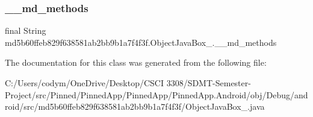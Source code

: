 \subsubsection{\texorpdfstring{\+\_\+\+\_\+md\+\_\+methods}{\_\_md\_methods}}
{\footnotesize\ttfamily final String md5b60ffeb829f638581ab2bb9b1a7f4f3f.\+Object\+Java\+Box\+\_.\+\_\+\+\_\+md\+\_\+methods\hspace{0.3cm}{\ttfamily [static]}}



The documentation for this class was generated from the following file\+:\begin{DoxyCompactItemize}
\item 
C\+:/\+Users/codym/\+One\+Drive/\+Desktop/\+C\+S\+C\+I 3308/\+S\+D\+M\+T-\/\+Semester-\/\+Project/src/\+Pinned/\+Pinned\+App/\+Pinned\+App/\+Pinned\+App.\+Android/obj/\+Debug/android/src/md5b60ffeb829f638581ab2bb9b1a7f4f3f/Object\+Java\+Box\+\_.\+java\end{DoxyCompactItemize}
